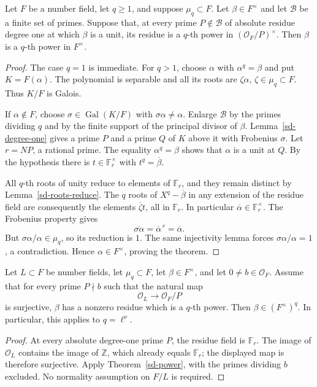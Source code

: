\begin{theorem}\label{sd-power}
Let \(F\) be a number field, let \(q\ge1\), and suppose
\(\mu_q\subset F\).
Let \(\beta\in F^\times\) and let \(\mathcal B\) be
a finite set of primes.
Suppose that, at every prime \(P\notin\mathcal B\)
of absolute residue degree one at which \(\beta\)
is a unit, its residue is a \(q\)-th power in
\((\mathcal O_F/P)^\times\).
Then \(\beta\) is a \(q\)-th power in \(F^\times\).
\end{theorem}
\begin{proof}
The case \(q=1\) is immediate.
For \(q>1\), choose \(\alpha\) with
\(\alpha^q=\beta\) and put \(K=F(\alpha)\).
The polynomial is separable and all its roots
are \(\zeta\alpha\), \(\zeta\in\mu_q\subset F\).
Thus \(K/F\) is Galois.

If \(\alpha\notin F\), choose
\(\sigma\in\operatorname{Gal}(K/F)\) with
\(\sigma\alpha\ne\alpha\).
Enlarge \(\mathcal B\) by the primes dividing \(q\)
and by the finite support of the principal divisor
of \(\beta\).
Lemma~\ref{sd-degree-one} gives a prime \(P\) and a
prime \(Q\) of \(K\) above it with Frobenius \(\sigma\).
Let \(r=NP\), a rational prime.
The equality \(\alpha^q=\beta\) shows that \(\alpha\)
is a unit at \(Q\).
By the hypothesis there is \(t\in\mathbb F_r^\times\)
with \(t^q=\overline\beta\).

All \(q\)-th roots of unity reduce to elements of
\(\mathbb F_r\), and they remain distinct by
Lemma~\ref{sd-roots-reduce}.
The \(q\) roots of \(X^q-\overline\beta\) in any
extension of the residue field are consequently the
elements \(\overline\zeta t\), all in \(\mathbb F_r\).
In particular \(\overline\alpha\in\mathbb F_r^\times\).
The Frobenius property gives
\[
             \overline{\sigma\alpha}
                  =\overline\alpha^{\,r}
                  =\overline\alpha.
\]
But \(\sigma\alpha/\alpha\in\mu_q\), so its reduction
is \(1\).  The same injectivity lemma forces
\(\sigma\alpha/\alpha=1\), a contradiction.
Hence \(\alpha\in F^\times\), proving the theorem.
\end{proof}

\begin{corollary}\label{sd-source}
Let \(L\subset F\) be number fields, let
\(\mu_q\subset F\), let \(\beta\in F^\times\),
and let \(0\ne b\in\mathcal O_F\).
Assume that for every prime \(P\nmid b\) such that
the natural map
\[
                 \mathcal O_L\longrightarrow\mathcal O_F/P
\]
is surjective, \(\beta\) has a nonzero residue
which is a \(q\)-th power.
Then \(\beta\in(F^\times)^q\).
In particular, this applies to \(q=\ell^\nu\).
\end{corollary}
\begin{proof}
At every absolute degree-one prime \(P\), the residue
field is \(\mathbb F_r\).  The image of \(\mathcal O_L\)
contains the image of \(\mathbb Z\), which already
equals \(\mathbb F_r\); the displayed map is therefore
surjective.  Apply Theorem~\ref{sd-power}, with the
primes dividing \(b\) excluded.
No normality assumption on \(F/L\) is required.
\end{proof}

